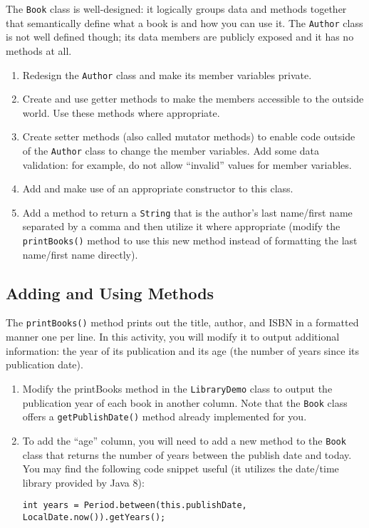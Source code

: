 \documentclass[12pt]{scrartcl}
\begin{document}
The \texttt{Book} class is well-designed: it logically groups 
data and methods together that semantically define what a book is and 
how you can use it.  The \texttt{Author} class is not well 
defined though; its data members are publicly exposed and it has no 
methods at all.

\begin{enumerate}
  \item Redesign the \texttt{Author} class and make its 
  	member variables private.
  \item Create and use getter methods to make the members accessible 
	to the outside world.  Use these methods where appropriate.
  \item Create setter methods (also called mutator methods) to enable 
	code outside of the \texttt{Author} class to change the 
	member variables.  Add some data validation: for example, do not 
	allow ``invalid'' values for member variables.  
  \item Add and make use of an appropriate constructor to this class.
  \item Add a method to return a \texttt{String} that is the 
	author's last name/first name separated by a comma and then utilize 
	it where appropriate (modify the \texttt{printBooks()} 
	method to use this new method instead of formatting the last 
	name/first name directly).
\end{enumerate}
	
\subsection*{Adding and Using Methods}

The \texttt{printBooks()} method prints out the title, author, 
and ISBN in a formatted manner one per line.  In this activity, you will 
modify it to output additional information: the year of its publication 
and its age (the number of years since its publication date).  

\begin{enumerate}
  \item Modify the printBooks method in the \texttt{LibraryDemo} 
    class to output the publication year of each book in another column.  
    Note that the \texttt{Book} class offers a 
    \texttt{getPublishDate()} method already implemented for 
    you.
  \item To add the ``age'' column, you will need to add a new method 
    to the \texttt{Book} class that returns the number of 
    years between the publish date and today.  You may find the following 
    code snippet useful (it utilizes the date/time library provided
    by Java 8):
    
    \texttt{int years = Period.between(this.publishDate, LocalDate.now()).getYears();}
\end{enumerate}
\end{document}
